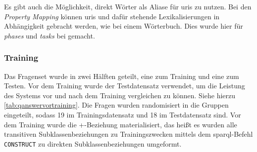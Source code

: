 Es gibt auch die Möglichkeit, direkt Wörter als Aliase für \acp{uri} zu nutzen.
Bei den \emph{Property Mapping} können \acp{uri} und dafür stehende Lexikalisierungen in Abhängigkeit gebracht werden, wie bei einem Wörterbuch.
Dies wurde hier für \emph{phases} und \emph{tasks} bei  gemacht.

\subsubsection{Training}

Das Fragenset wurde in zwei Hälften geteilt, eine zum Training und eine zum Testen.
Vor dem Training wurde der Testdatensatz verwendet, um die Leistung des Systems vor und nach dem Training vergleichen zu können.
Siehe hierzu \cref{tab:qanswervortraining}.
Die Fragen wurden randomisiert in die Gruppen eingeteilt, sodass 19 im Trainingsdatensatz und 18 im Testdatensatz sind.
Vor dem Training wurde die +-Beziehung materialisiert,
das heißt es wurden alle transitiven Subklassenbeziehungen zu Trainingszwecken mittels dem \ac{sparql}-Befehl \texttt{CONSTRUCT} zu direkten Subklassenbeziehungen umgeformt.

